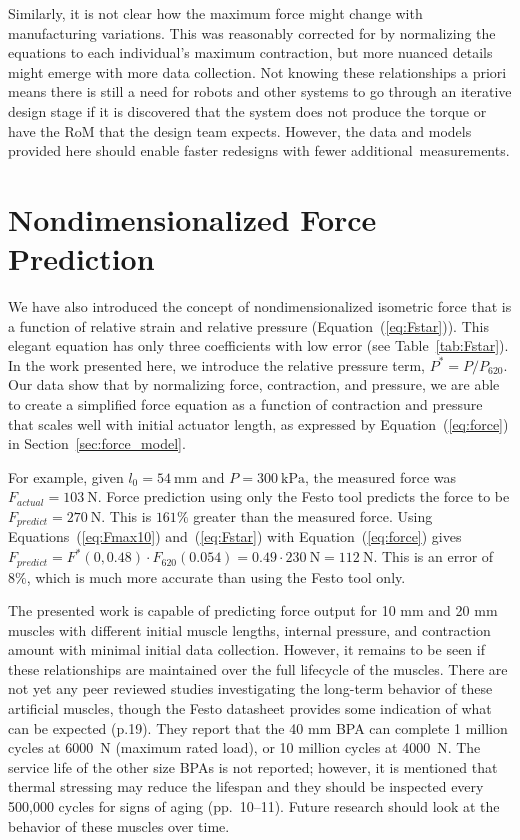 Similarly, it is not clear how the maximum force might change with manufacturing variations. This was reasonably corrected for by normalizing the equations to each individual's maximum contraction, but more nuanced details might emerge with more data collection. Not knowing these relationships a priori means there is still a need for robots and other systems to go through an iterative design stage if it is discovered that the system does not produce the torque or have the RoM that the design team expects. However, the data and models provided here should enable faster redesigns with fewer \mbox{additional measurements.}


\section{Nondimensionalized Force Prediction}

We have also introduced the concept of nondimensionalized isometric force that is a function of relative strain and relative pressure (Equation~(\ref{eq:Fstar})). This elegant equation has only three coefficients with low error (see Table~\ref{tab:Fstar}). In the work presented here, we introduce the relative pressure term, $P^*=P/P_{620}$. Our data show that by normalizing force, contraction, and pressure, we are able to create a simplified force equation as a function of contraction and pressure that scales well with initial actuator length, as expressed by Equation~(\ref{eq:force}) in Section~\ref{sec:force_model}.

For example, given $l_0=\qty{54}{\mm}$ and $P=\qty{300}{\kPa}$, the measured force was \mbox{$F_{actual} = \qty{103}{\N}$.} Force prediction using only the Festo tool predicts the force to be \mbox{$F_{predict} = \qty{270}{\N}$.} This is $161\%$ greater than the measured force. Using Equations~(\ref{eq:Fmax10}) and~(\ref{eq:Fstar}) with Equation~(\ref{eq:force}) gives $F_{predict} = F^*(0, 0.48) \cdot F_{620}(0.054) = 0.49 \cdot \qty{230}{\N} = \qty{112}{\N}$. This is an error of $8\%$, which is much more accurate than using the Festo tool only.

The presented work is capable of predicting force output for 10 mm and 20 mm muscles with different initial muscle lengths, internal pressure, and contraction amount with minimal initial data collection. However, it remains to be seen if these relationships are maintained over the full lifecycle of the muscles. There are not yet any peer reviewed studies investigating the long-term behavior of these artificial muscles, though the Festo datasheet provides some indication of what can be expected \citep{festo_2026} (p.19). They report that the 40 mm BPA can complete 1 million cycles at \qty{6000}{\N} (maximum rated load), or 10 million cycles at \qty{4000}{\N}. The service life of the other size BPAs is not reported; however, it is mentioned that thermal stressing may reduce the lifespan and they should be inspected every 500,000 cycles for signs of aging \citep{festo_2018} (pp.~10--11). Future research should look at the behavior of these muscles over time.

